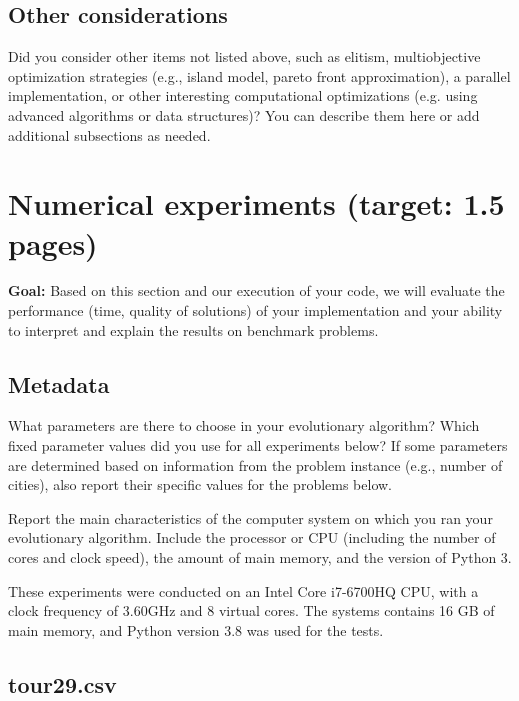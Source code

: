 \documentclass[a4paper,10pt]{article}
\newcommand{\ReplaceMe}[1]{{\color{blue}#1}}
\newcommand{\RemoveMe}[1]{{\color{purple}#1}}
\begin{document}
\subsection{Other considerations}


\ReplaceMe{Did you consider other items not listed above, such as elitism, multiobjective optimization strategies (e.g., island model, pareto front approximation), a parallel implementation, or other interesting computational optimizations (e.g. using advanced algorithms or data structures)? You can describe them here or add additional subsections as needed.}


\section{Numerical experiments (target: 1.5 pages)}

\RemoveMe{\textbf{Goal:} Based on this section and our execution of your code, we will evaluate the performance (time, quality of solutions) of your implementation and your ability to interpret and explain the results on benchmark problems.}

\subsection{Metadata}

\ReplaceMe{What parameters are there to choose in your evolutionary algorithm? Which fixed parameter values did you use for all experiments below? If some parameters are determined based on information from the problem instance (e.g., number of cities), also report their specific values for the problems below.

Report the main characteristics of the computer system on which you ran your evolutionary algorithm. Include the processor or CPU (including the number of cores and clock speed), the amount of main memory, and the version of Python 3.}
These experiments were conducted on an Intel Core i7-6700HQ CPU, with a clock frequency of 3.60GHz and 8 virtual cores. The systems contains 16 GB of main memory, and Python version 3.8 was used for the tests.

\subsection{tour29.csv}
\end{document}
